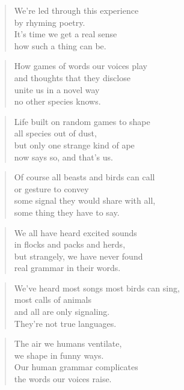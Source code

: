 \documentclass[10pt,a4paper]{article}
\begin{document}
\begin{multicols}{2}


\begin{verse}
We’re led through this experience\\
by rhyming poetry.\\
It’s time we get a real sense\\
how such a thing can be.
\end{verse}

\begin{verse}
How games of words our voices play\\
and thoughts that they disclose\\
unite us in a novel way\\
no other species knows.
\end{verse}

\begin{verse}
Life built on random games to shape\\
all species out of dust,\\
but only one strange kind of ape\\
now says so, and that’s us.
\end{verse}

\begin{verse}
Of course all beasts and birds can call\\
or gesture to convey\\
some signal they would share with all,\\
some thing they have to say.
\end{verse}

\begin{verse}
We all have heard excited sounds\\
in flocks and packs and herds,\\
but strangely, we have never found\\
real grammar in their words.
\end{verse}

\begin{verse}
We’ve heard most songs most birds can sing,\\
most calls of animals\\
and all are only signaling.\\
They’re not true languages.
\end{verse}

\begin{verse}
The air we humans ventilate,\\
we shape in funny ways.\\
Our human grammar complicates\\
the words our voices raise.
\end{verse}


\end{multicols}
\end{document}
